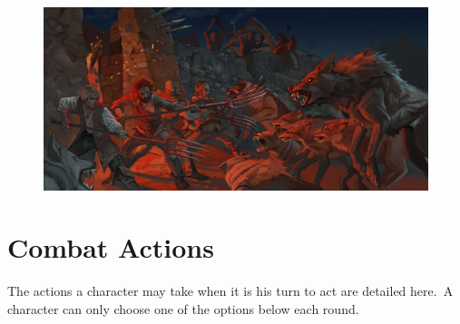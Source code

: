\begin{figure}%
\begin{center}
\includegraphics[scale=1.3]{img/fending_off_the_wolves_by_ncorva.jpg}
\end{center}
\end{figure}


\section{Combat Actions}
The actions a character may take when it is his turn to act are detailed here. A character can only choose one of the options below each round.

